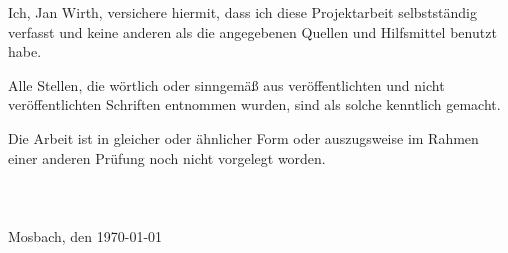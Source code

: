 Ich, Jan Wirth, versichere hiermit, dass ich diese Projektarbeit selbstständig verfasst
und keine anderen als die angegebenen Quellen und Hilfsmittel benutzt habe.
\par

Alle Stellen, die wörtlich oder sinngemäß aus veröffentlichten und nicht veröffentlichten Schriften entnommen wurden, sind als solche kenntlich gemacht.
\par

Die Arbeit ist in gleicher oder ähnlicher Form oder auszugsweise im Rahmen einer anderen Prüfung noch nicht vorgelegt worden.
\\
\vspace{2cm}
\\
\unterschrift\\
\noindent\verfasser
\\
\noindent Mosbach, den \today
